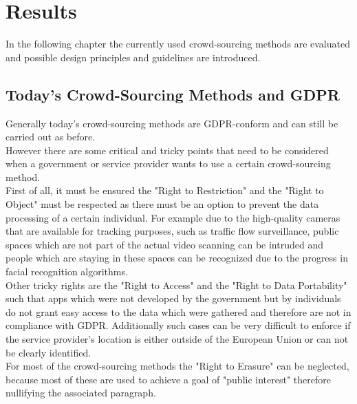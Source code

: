 \documentclass[a4paper,12pt]{report}
\begin{document}
	\chapter{Results}
	In the following chapter the currently used crowd-sourcing methods are evaluated and possible design principles and guidelines are introduced.
	
	\section{Today's Crowd-Sourcing Methods and GDPR} \label{juxtaposition}
	\startsection
		Generally today's crowd-sourcing methods are GDPR-conform and can still be carried out as before. \\
		However there are some critical and tricky points that need to be considered when a government or service provider wants to use a certain crowd-sourcing method. \\
		First of all, it must be ensured the "Right to Restriction" and the "Right to Object" must be respected as there must be an option to prevent the data processing of a certain individual. For example due to the high-quality cameras that are available for tracking purposes, such as traffic flow surveillance, public spaces which are not part of the actual video scanning can be intruded and people which are staying in these spaces can be recognized due to the progress in facial recognition algorithms. \\
		Other tricky rights are the "Right to Access" and the "Right to Data Portability" such that apps which were not developed by the government but by individuals do not grant easy access to the data which were gathered and therefore are not in compliance with GDPR. Additionally such cases can be very difficult to enforce if the service provider's location is either outside of the European Union or can not be clearly identified. \\
		For most of the crowd-sourcing methods the "Right to Erasure" can be neglected, because most of these are used to achieve a goal of "public interest" therefore nullifying the associated paragraph.
	\closesection
	
\end{document}
